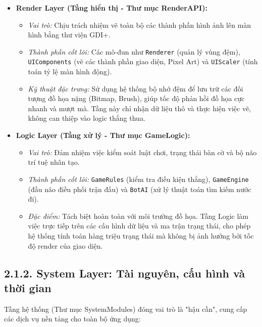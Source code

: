 \begin{itemize}
    \item \textbf{Render Layer (Tầng hiển thị - Thư mục RenderAPI):}
    \begin{itemize}
        \item \textit{Vai trò:} Chịu trách nhiệm vẽ toàn bộ các thành phần hình ảnh lên màn hình bằng thư viện GDI+.
        \item \textit{Thành phần cốt lõi:} Các mô-đun như \texttt{Renderer} (quản lý vùng đệm), \\ \texttt{UIComponents} (vẽ các thành phần giao diện, Pixel Art) và \texttt{UIScaler} (tính toán tỷ lệ màn hình động).
        \item \textit{Kỹ thuật đặc trưng:} Sử dụng hệ thống bộ nhớ đệm để lưu trữ các đối tượng đồ họa nặng (Bitmap, Brush), giúp tốc độ phản hồi đồ họa cực nhanh và mượt mà. Tầng này chỉ nhận dữ liệu thô và thực hiện việc vẽ, không can thiệp vào logic thắng thua.
    \end{itemize}

    \item \textbf{Logic Layer (Tầng xử lý - Thư mục GameLogic):}
    \begin{itemize}
        \item \textit{Vai trò:} Đảm nhiệm việc kiểm soát luật chơi, trạng thái bàn cờ và bộ não trí tuệ nhân tạo.
        \item \textit{Thành phần cốt lõi:} \texttt{GameRules} (kiểm tra điều kiện thắng), \texttt{GameEngine} (đầu não điều phối trận đấu) và \texttt{BotAI} (xử lý thuật toán tìm kiếm nước đi).
        \item \textit{Đặc điểm:} Tách biệt hoàn toàn với môi trường đồ họa. Tầng Logic làm việc trực tiếp trên các cấu hình dữ liệu và ma trận trạng thái, cho phép hệ thống tính toán hàng triệu trạng thái mà không bị ảnh hưởng bởi tốc độ render của giao diện.
    \end{itemize}
\end{itemize}

\subsection*{2.1.2. System Layer: Tài nguyên, cấu hình và thời gian}

\noindent \indent Tầng hệ thống (Thư mục SystemModules) đóng vai trò là "hậu cần", cung cấp các dịch vụ nền tảng cho toàn bộ ứng dụng:

